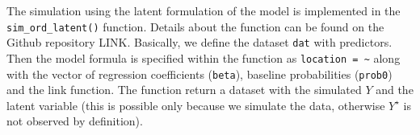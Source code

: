 \documentclass[
  man,floatsintext]{apa6}
\newenvironment{Shaded}{\begin{snugshade}}{\end{snugshade}}
\newcommand{\AttributeTok}[1]{\textcolor[rgb]{0.13,0.29,0.53}{#1}}
\newcommand{\CommentTok}[1]{\textcolor[rgb]{0.56,0.35,0.01}{\textit{#1}}}
\newcommand{\FunctionTok}[1]{\textcolor[rgb]{0.13,0.29,0.53}{\textbf{#1}}}
\newcommand{\NormalTok}[1]{#1}
\newcommand{\OtherTok}[1]{\textcolor[rgb]{0.56,0.35,0.01}{#1}}
\newcommand{\SpecialCharTok}[1]{\textcolor[rgb]{0.81,0.36,0.00}{\textbf{#1}}}
\newcommand{\StringTok}[1]{\textcolor[rgb]{0.31,0.60,0.02}{#1}}
\begin{document}
\begin{Shaded}
\end{Shaded}

\normalsize

The simulation using the latent formulation of the model is implemented in the \texttt{sim\_ord\_latent()} function. Details about the function can be found on the Github repository LINK. Basically, we define the dataset \texttt{dat} with predictors. Then the model formula is specified within the function as \texttt{location\ =\ \textasciitilde{}} along with the vector of regression coefficients (\texttt{beta}), baseline probabilities (\texttt{prob0}) and the link function. The function return a dataset with the simulated \(Y\) and the latent variable (this is possible only because we simulate the data, otherwise \(Y^{\star}\) is not observed by definition).
\end{document}
